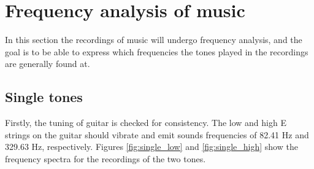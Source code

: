 \section{Frequency analysis of music}
In this section the recordings of music will undergo frequency analysis, and the goal is to be able to express which frequencies the tones played in the recordings are generally found at.

\subsection{Single tones}\label{sec:single}
Firstly, the tuning of guitar is checked for consistency. The low and high E strings on the guitar should vibrate and emit sounds frequencies of 82.41 Hz and 329.63 Hz, respectively. Figures \ref{fig:single_low} and \ref{fig:single_high} show the frequency spectra for the recordings of the two tones.

